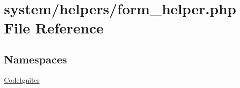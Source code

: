 \hypertarget{form__helper_8php}{}\section{system/helpers/form\+\_\+helper.php File Reference}
\label{form__helper_8php}
\subsection*{Namespaces}
\begin{DoxyCompactItemize}
\item 
 \mbox{\hyperlink{namespace_code_igniter}{Code\+Igniter}}
\end{DoxyCompactItemize}
